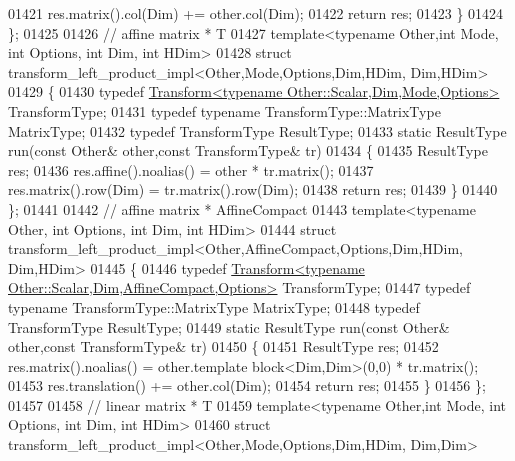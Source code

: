 \begin{DoxyCode}
01421     res.matrix().col(Dim) += other.col(Dim);
01422     \textcolor{keywordflow}{return} res;
01423   \}
01424 \};
01425 
01426 \textcolor{comment}{// affine matrix * T}
01427 \textcolor{keyword}{template}<\textcolor{keyword}{typename} Other,\textcolor{keywordtype}{int} Mode, \textcolor{keywordtype}{int} Options, \textcolor{keywordtype}{int} Dim, \textcolor{keywordtype}{int} HDim>
01428 \textcolor{keyword}{struct }transform\_left\_product\_impl<Other,Mode,Options,Dim,HDim, Dim,HDim>
01429 \{
01430   \textcolor{keyword}{typedef} \hyperlink{group___geometry___module_class_eigen_1_1_transform}{Transform<typename Other::Scalar,Dim,Mode,Options>}
       TransformType;
01431   \textcolor{keyword}{typedef} \textcolor{keyword}{typename} TransformType::MatrixType MatrixType;
01432   \textcolor{keyword}{typedef} TransformType ResultType;
01433   \textcolor{keyword}{static} ResultType run(\textcolor{keyword}{const} Other& other,\textcolor{keyword}{const} TransformType& tr)
01434   \{
01435     ResultType res;
01436     res.affine().noalias() = other * tr.matrix();
01437     res.matrix().row(Dim) = tr.matrix().row(Dim);
01438     \textcolor{keywordflow}{return} res;
01439   \}
01440 \};
01441 
01442 \textcolor{comment}{// affine matrix * AffineCompact}
01443 \textcolor{keyword}{template}<\textcolor{keyword}{typename} Other, \textcolor{keywordtype}{int} Options, \textcolor{keywordtype}{int} Dim, \textcolor{keywordtype}{int} HDim>
01444 \textcolor{keyword}{struct }transform\_left\_product\_impl<Other,AffineCompact,Options,Dim,HDim, Dim,HDim>
01445 \{
01446   \textcolor{keyword}{typedef} \hyperlink{group___geometry___module_class_eigen_1_1_transform}{Transform<typename Other::Scalar,Dim,AffineCompact,Options>}
       TransformType;
01447   \textcolor{keyword}{typedef} \textcolor{keyword}{typename} TransformType::MatrixType MatrixType;
01448   \textcolor{keyword}{typedef} TransformType ResultType;
01449   \textcolor{keyword}{static} ResultType run(\textcolor{keyword}{const} Other& other,\textcolor{keyword}{const} TransformType& tr)
01450   \{
01451     ResultType res;
01452     res.matrix().noalias() = other.template block<Dim,Dim>(0,0) * tr.matrix();
01453     res.translation() += other.col(Dim);
01454     \textcolor{keywordflow}{return} res;
01455   \}
01456 \};
01457 
01458 \textcolor{comment}{// linear matrix * T}
01459 \textcolor{keyword}{template}<\textcolor{keyword}{typename} Other,\textcolor{keywordtype}{int} Mode, \textcolor{keywordtype}{int} Options, \textcolor{keywordtype}{int} Dim, \textcolor{keywordtype}{int} HDim>
01460 \textcolor{keyword}{struct }transform\_left\_product\_impl<Other,Mode,Options,Dim,HDim, Dim,Dim>

\end{DoxyCode}
